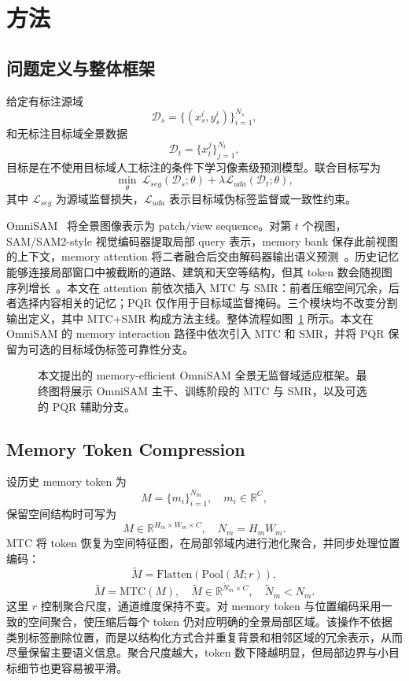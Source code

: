 \section{方法}
\label{sec:method}

\subsection{问题定义与整体框架}
给定有标注源域
\[
\mathcal{D}_s=\{(x_s^i,y_s^i)\}_{i=1}^{N_s},
\]
和无标注目标域全景数据
\[
\mathcal{D}_t=\{x_t^j\}_{j=1}^{N_t},
\]
目标是在不使用目标域人工标注的条件下学习像素级预测模型。联合目标写为
\[
\min_{\theta}\ \mathcal{L}_{seg}(\mathcal{D}_s;\theta)+\lambda\mathcal{L}_{uda}(\mathcal{D}_t;\theta),
\]
其中 $\mathcal{L}_{seg}$ 为源域监督损失，$\mathcal{L}_{uda}$ 表示目标域伪标签监督或一致性约束。

OmniSAM~\cite{zhong2025omnisam} 将全景图像表示为 patch/view sequence。对第 $t$ 个视图，SAM/SAM2-style 视觉编码器提取局部 query 表示，memory bank 保存此前视图的上下文，memory attention 将二者融合后交由解码器输出语义预测~\cite{kirillov2023segment,ravi2025sam2}。历史记忆能够连接局部窗口中被截断的道路、建筑和天空等结构，但其 token 数会随视图序列增长~\cite{rao2021dynamicvit,bolya2023tome,lu2023tokensharing}。本文在 attention 前依次插入 MTC 与 SMR：前者压缩空间冗余，后者选择内容相关的记忆；PQR 仅作用于目标域监督掩码。三个模块均不改变分割输出定义，其中 MTC+SMR 构成方法主线。整体流程如图~\ref{fig:overall_pipeline} 所示。本文在 OmniSAM 的 memory interaction 路径中依次引入 MTC 和 SMR，并将 PQR 保留为可选的目标域伪标签可靠性分支。

\begin{figure}[t]
    \centering
    \caption{本文提出的 memory-efficient OmniSAM 全景无监督域适应框架。最终图将展示 OmniSAM 主干、训练阶段的 MTC 与 SMR，以及可选的 PQR 辅助分支。}
    \label{fig:overall_pipeline}
\end{figure}

\subsection{Memory Token Compression}
设历史 memory token 为
\[
M=\{m_i\}_{i=1}^{N_m},\quad m_i\in\mathbb{R}^{C},
\]
保留空间结构时可写为
\[
M\in\mathbb{R}^{H_m\times W_m\times C},\quad N_m=H_mW_m.
\]
MTC 将 token 恢复为空间特征图，在局部邻域内进行池化聚合，并同步处理位置编码：
\[
\tilde{M}=\mathrm{Flatten}(\mathrm{Pool}(M;r)),
\]
\[
\tilde{M}=\mathrm{MTC}(M),\quad
\tilde{M}\in\mathbb{R}^{\tilde{N}_m\times C},\quad
\tilde{N}_m<N_m.
\]
这里 $r$ 控制聚合尺度，通道维度保持不变。对 memory token 与位置编码采用一致的空间聚合，使压缩后每个 token 仍对应明确的全景局部区域。该操作不依据类别标签删除位置，而是以结构化方式合并重复背景和相邻区域的冗余表示，从而尽量保留主要语义信息。聚合尺度越大，token 数下降越明显，但局部边界与小目标细节也更容易被平滑。

